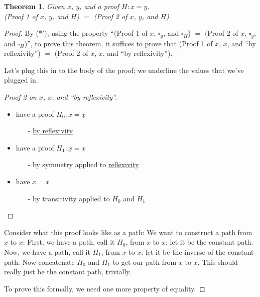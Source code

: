 \documentclass{article}
\newtheorem*{thm*}{Theorem}
\theoremstyle{definition}
\begin{document}
\begin{thm*}
Given $x$, $y$, and a proof $H : x = y$, \\ (Proof 1 of $x$, $y$, and $H$) $=$ (Proof 2 of $x$, $y$, and $H$)
\end{thm*}
\begin{proof} By ($\ast'$), using the property ``(Proof 1 of $x$, $\square_y$, and $\square_H$) $=$ (Proof 2 of $x$, $\square_y$, and $\square_H$)'', to prove this theorem, it suffices to prove that (Proof 1 of $x$, $x$, and ``by reflexivity'') $=$ (Proof 2 of $x$, $x$, and ``by reflexivity'').

Let's plug this in to the body of the proof; we underline the values that we've plugged in.

{\setlength{\parskip}{0pt}%
\begin{proof}[Proof 2 on $x$, $x$, and ``by reflexivity'']
$\left.\right.$\\
  \begin{itemize}
    \item have a proof $H_0 : x = \underline{x}$
    \begin{itemize}
      \item[-] \underline{by reflexivity}
    \end{itemize}
    \item have a proof $H_1 : \underline{x} = x$
      \begin{itemize}
        \item[-] by symmetry applied to \underline{reflexivity}
      \end{itemize}
    \item have $x = x$
      \begin{itemize}
        \item[-] by transitivity applied to $H_0$ and $H_1$
      \end{itemize}
  \end{itemize}
\end{proof}
}

Consider what this proof looks like as a path: We want to construct a path from $x$ to $x$.  First, we have a path, call it $H_0$, from $x$ to $x$: let it be the constant path.  Now, we have a path, call it $H_1$, from $x$ to $x$: let it be the inverse of the constant path.  Now concatenate $H_0$ and $H_1$ to get our path from $x$ to $x$.  This should really just be the constant path, trivially.

To prove this formally, we need one more property of equality.




\end{proof}
\end{document}
